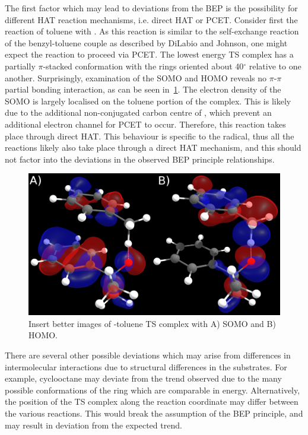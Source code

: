 The first factor which may lead to deviations from the BEP is the possibility for different HAT reaction mechanisms, i.e. direct HAT or PCET. Consider first the reaction of toluene with \cumo. As this reaction is similar to the self-exchange reaction of the benzyl-toluene couple as described by DiLabio and Johnson,\cite{DiLabio2007} one might expect the reaction to proceed via PCET. The lowest energy TS complex has a partially $\pi$-stacked conformation with the rings oriented about 40$^\circ$ relative to one another. Surprisingly, examination of the SOMO and HOMO reveals no $\pi$-$\pi$ partial bonding interaction, as can be seen in~\ref{fig:cumo-toluene}. The electron density of the SOMO is largely localised on the toluene portion of the complex. This is likely due to the additional non-conjugated carbon centre of \cumo, which prevent an additional electron channel for PCET to occur. Therefore, this reaction takes place through direct HAT. This behaviour is specific to the \cumo radical, thus all the reactions likely also take place through a direct HAT mechanism, and this should not factor into the deviations in the observed BEP principle relationships.

\begin{figure}[htb]
  \includegraphics[width=\textwidth]{figures/cumo-toluene}
  \caption{Insert better images of \cumo-toluene TS complex with A) SOMO and B) HOMO.}
  \label{fig:cumo-toluene}
\end{figure}

There are several other possible deviations which may arise from differences in intermolecular interactions due to structural differences in the substrates. For example, cyclooctane may deviate from the trend observed due to the many possible conformations of the ring which are comparable in energy.\cite{Dorofeeva1985} Alternatively, the position of the TS complex along the reaction coordinate may differ between the various reactions. This would break the assumption of the BEP principle, and may result in deviation from the expected trend.

